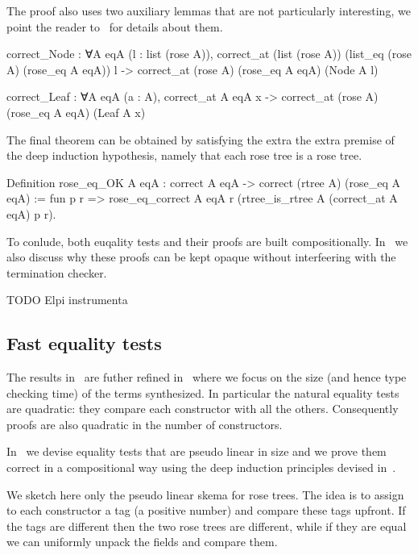 \documentclass[a4paper, 11pt]{book}
\begin{document}
The proof also uses two auxiliary lemmas that are not particularly interesting,
we point the reader to~\cite{tassi:hal-01897468} for details about them.

\begin{coqcode}
correct_Node : ∀A eqA (l : list (rose A)),
  correct_at (list (rose A)) (list_eq (rose A) (rose_eq A eqA)) l ->
    correct_at (rose A) (rose_eq A eqA) (Node A l)

correct_Leaf : ∀A eqA (a : A),
  correct_at A eqA x ->
    correct_at (rose A) (rose_eq A eqA) (Leaf A x)
  \end{coqcode}
  
The final theorem can be obtained by satisfying the extra the extra
premise of the deep induction hypothesis, namely that each rose tree
is a rose tree.

\begin{coqcode}
Definition rose_eq_OK A eqA :
  correct A eqA -> correct (rtree A) (rose_eq A eqA)
:=
  fun p r =>
    rose_eq_correct A eqA
      r (rtree_is_rtree A (correct_at A eqA) p r).
\end{coqcode}

To conlude, both euqality tests and their proofs are built compositionally.
In~\cite{tassi:hal-01897468} we also discuss why these proofs can be kept opaque
without interfeering with the termination checker.

TODO Elpi instrumenta

\subsection{Fast equality tests}

The results in~\cite{tassi:hal-01897468} are futher refined in~\cite{gregoire:hal-03800154}
where we focus on the size (and hence type checking time) of the terms
synthesized. In particular the natural equality tests are quadratic: they
compare each constructor with all the others. Consequently proofs are also
quadratic in the number of constructors.

In~\cite{gregoire:hal-03800154} we devise equality tests that are pseudo
linear in size and we prove them correct in a compositional way using the deep
induction principles devised in~\cite{tassi:hal-01897468}.

We sketch here only the pseudo linear skema for rose trees. The idea
is to assign to each constructor a tag (a positive number) and
compare these tags upfront. If the tags are different then
the two rose trees are different, while if they are equal we can
uniformly unpack the fields and compare them.
\end{document}
